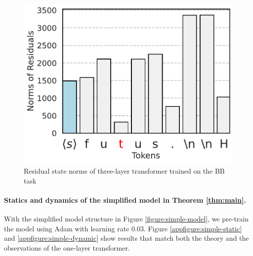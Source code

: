 \begin{figure}[t]
  \begin{minipage}{0.3\textwidth}
      \centering
      \vspace{-.2em}
      \includegraphics[width=\linewidth]{Figures/BBM_appendix/norms_layer_2.pdf}
  \end{minipage}
  \caption{\small Residual state norms of three-layer transformer trained on the BB task}
  \label{appfigure:massive-norm}
  \vspace{-1em}
\end{figure}

\paragraph{Statics and dynamics of the simplified model in Theorem \ref{thm:main}.} With the simplified model structure in Figure \ref{figure:simple-model}, we pre-train the model using Adam with learning rate $0.03$. Figure \ref{appfigure:simple-static} and \ref{appfigure:simple-dynamic} show results that match both the theory and the observations of the one-layer transformer. 

